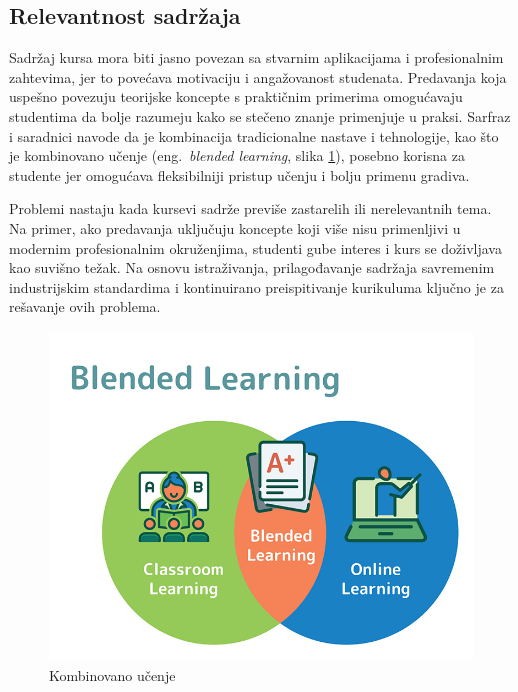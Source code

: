 \documentclass[a4paper]{article}
\begin{document}
\subsection{Relevantnost sadržaja}
Sadržaj kursa mora biti jasno povezan sa stvarnim aplikacijama i profesionalnim zahtevima,
jer to povećava motivaciju i angažovanost studenata. Predavanja koja uspešno povezuju
teorijske koncepte s praktičnim primerima omogućavaju studentima da bolje razumeju kako
se stečeno znanje primenjuje u praksi. Sarfraz i saradnici \cite{sarfraz2022viability} navode da je kombinacija
tradicionalne nastave i tehnologije, kao što je kombinovano učenje (eng.~{\em blended learning}, slika \ref{fig:kombinovano_ucenje}), posebno korisna za studente
jer omogućava fleksibilniji pristup učenju i bolju primenu gradiva.

Problemi nastaju kada kursevi sadrže previše zastarelih ili nerelevantnih tema. Na primer,
ako predavanja uključuju koncepte koji više nisu primenljivi u modernim profesionalnim
okruženjima, studenti gube interes i kurs se doživljava kao suvišno težak. Na osnovu
istraživanja, prilagođavanje sadržaja savremenim industrijskim standardima i kontinuirano
preispitivanje kurikuluma ključno je za rešavanje ovih problema.

\begin{figure}[h!]
\begin{center}
\includegraphics[scale=0.3]{blended_learning.png}
\end{center}
\caption{Kombinovano učenje}
\label{fig:kombinovano_ucenje}
\end{figure}
\end{document}
